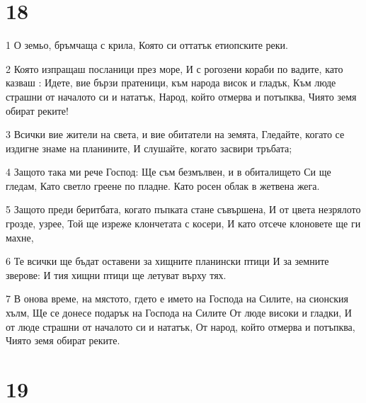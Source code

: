 \chapter{18}

\par 1 О земьо, бръмчаща с крила, Която си оттатък етиопските реки.
\par 2 Която изпращаш посланици през море, И с рогозени кораби по вадите, като казваш : Идете, вие бързи пратеници, към народа висок и гладък, Към люде страшни от началото си и нататък, Народ, който отмерва и потъпква, Чиято земя обират реките!
\par 3 Всички вие жители на света, и вие обитатели на земята, Гледайте, когато се издигне знаме на планините, И слушайте, когато засвири тръбата;
\par 4 Защото така ми рече Господ: Ще съм безмълвен, и в обиталището Си ще гледам, Като светло греене по пладне. Като росен облак в жетвена жега.
\par 5 Защото преди беритбата, когато пъпката стане съвършена, И от цвета незрялото грозде, узрее, Той ще изреже клончетата с косери, И като отсече клоновете ще ги махне,
\par 6 Те всички ще бъдат оставени за хищните планински птици И за земните зверове: И тия хищни птици ще летуват върху тях.
\par 7 В онова време, на мястото, гдето е името на Господа на Силите, на сионския хълм, Ще се донесе подарък на Господа на Силите От люде високи и гладки, И от люде страшни от началото си и нататък, От народ, който отмерва и потъпква, Чиято земя обират реките.

\chapter{19}

